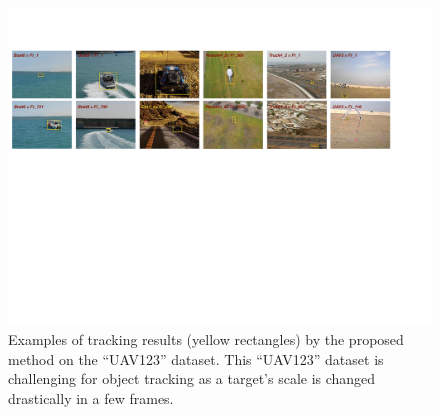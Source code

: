 \documentclass{bmvc2k}
\begin{document}
\begin{figure}[!t]
\includegraphics[width=\textwidth]{figures/ResultsIntroduction.pdf}
\caption{Examples of tracking results (yellow rectangles) by the
  proposed method on the ``UAV123'' dataset. This ``UAV123'' dataset
  is challenging for object tracking as a target's scale is changed
  drastically in a few frames.}
\label{ResultsIntroduction}
\end{figure}
\end{document}
